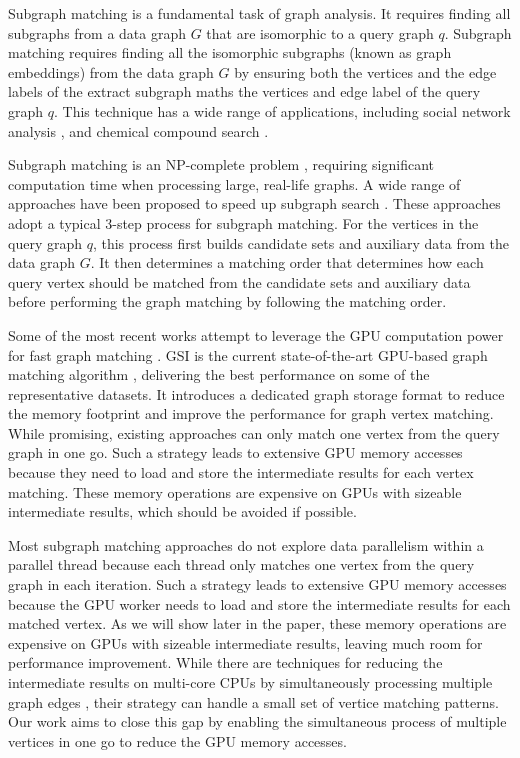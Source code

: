 Subgraph matching is a fundamental task of graph analysis. It requires finding all subgraphs from a data graph $G$ that are isomorphic to a
query graph $q$. Subgraph matching requires finding all the isomorphic subgraphs (known as graph embeddings) from the data graph $G$ by
ensuring both the vertices and the edge labels of the extract subgraph maths the vertices and edge label of the query graph $q$. This
technique has a wide range of applications, including social network analysis \cite{wang2012truss,kairam2012The}, and chemical compound
search \cite{wooyoung2011Biological}.

Subgraph matching is an NP-complete problem \cite{garey1979Computers}, requiring significant computation time when processing large, real-life
graphs. A wide range of approaches have been proposed to speed up subgraph search
\cite{bhattarai2019ceci,guo2020gpu,tran2015fast,shi2020graphpi,bi2016efficient,zeng2020gsi,sun2020subgraph,guo2020exploiting,sun2020rapidmatch,lin2016network}.
These approaches adopt a typical 3-step process for subgraph matching. For the vertices in the query graph $q$, this process first builds
candidate sets and auxiliary data from the data graph $G$. It then determines a matching order that determines how each query vertex
should be matched from the candidate sets and auxiliary data before performing the graph matching by following the matching order.

Some of the most recent works attempt to leverage the GPU computation power for fast graph matching
\cite{lin2016network,guo2020gpu,tran2015fast,zeng2020gsi,guo2020exploiting}. GSI is the current state-of-the-art GPU-based graph matching
algorithm \cite{zeng2020gsi}, delivering the best performance on some of the representative datasets. It introduces a dedicated graph
storage format to reduce the memory footprint and improve the performance for graph vertex matching. While promising, existing approaches
can only match one vertex from the query graph in one go. Such a strategy leads to extensive GPU memory accesses because they need to load
and store the intermediate results for each vertex matching. These memory operations are expensive on GPUs with sizeable intermediate
results, which should be avoided if possible.


Most subgraph matching approaches do not explore data parallelism within a parallel thread because each thread only matches one vertex from
the query graph in each iteration. Such a strategy leads to extensive GPU memory accesses because the GPU worker needs to load and store
the intermediate results for each matched vertex. As we will show later in the paper, these memory operations are expensive on GPUs with
sizeable intermediate results, leaving much room for performance improvement. While there are techniques for reducing the intermediate
results on multi-core CPUs by simultaneously processing multiple graph edges \cite{lai2015scalable}, their strategy can handle a small set
of vertice matching patterns. Our work aims to close this gap by enabling the simultaneous process of multiple vertices in one go to reduce
the GPU memory accesses.

